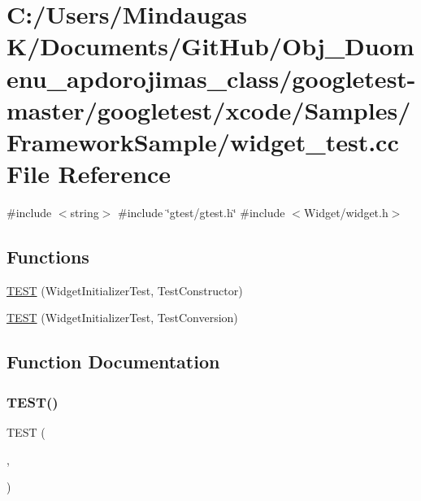\hypertarget{googletest-master_2googletest_2xcode_2_samples_2_framework_sample_2widget__test_8cc}{}\section{C\+:/\+Users/\+Mindaugas K/\+Documents/\+Git\+Hub/\+Obj\+\_\+\+Duomenu\+\_\+apdorojimas\+\_\+class/googletest-\/master/googletest/xcode/\+Samples/\+Framework\+Sample/widget\+\_\+test.cc File Reference}
\label{googletest-master_2googletest_2xcode_2_samples_2_framework_sample_2widget__test_8cc}
{\ttfamily \#include $<$string$>$}\newline
{\ttfamily \#include \char`\"{}gtest/gtest.\+h\char`\"{}}\newline
{\ttfamily \#include $<$Widget/widget.\+h$>$}\newline
\subsection*{Functions}
\begin{DoxyCompactItemize}
\item 
\mbox{\hyperlink{googletest-master_2googletest_2xcode_2_samples_2_framework_sample_2widget__test_8cc_a291536a26f617362e0c4b58941eeaead}{T\+E\+ST}} (Widget\+Initializer\+Test, Test\+Constructor)
\item 
\mbox{\hyperlink{googletest-master_2googletest_2xcode_2_samples_2_framework_sample_2widget__test_8cc_ab0b72ae0a336fd2a4470c6b5566cd8c0}{T\+E\+ST}} (Widget\+Initializer\+Test, Test\+Conversion)
\end{DoxyCompactItemize}


\subsection{Function Documentation}
\mbox{\label{googletest-master_2googletest_2xcode_2_samples_2_framework_sample_2widget__test_8cc_a291536a26f617362e0c4b58941eeaead}} 
\subsubsection{\texorpdfstring{TEST()}{TEST()}\hspace{0.1cm}{\footnotesize\ttfamily [1/2]}}
{\footnotesize\ttfamily T\+E\+ST (\begin{DoxyParamCaption}\item[{Widget\+Initializer\+Test}]{,  }\item[{Test\+Constructor}]{ }\end{DoxyParamCaption})}


